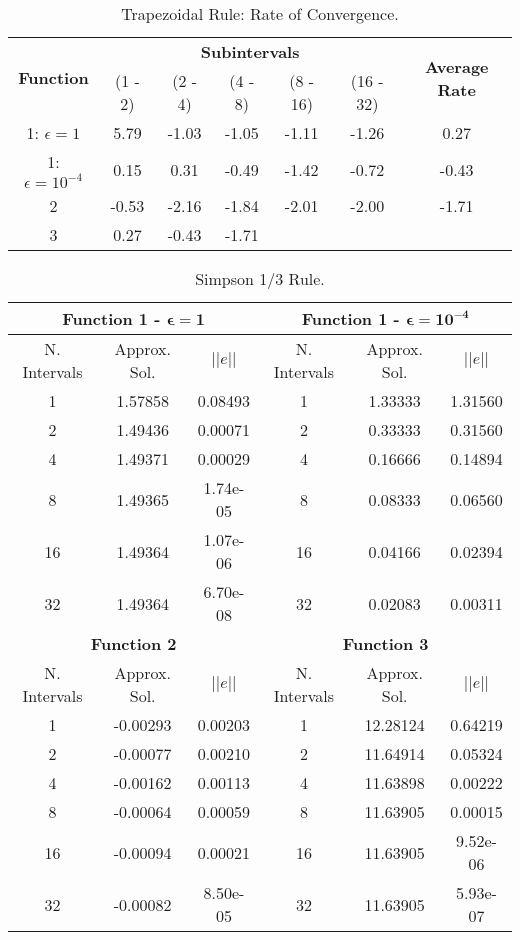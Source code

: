 \begin{table}[H]
    \centering
    \caption{Trapezoidal Rule: Rate of Convergence.}
    \begin{tabular}{ccccccc}
        \hline
        \multirow{2}{*}{\textbf{Function}} & \multicolumn{5}{c}{\textbf{Subintervals}} & \multicolumn{1}{c}{\multirow{2}{*}{\textbf{Average Rate}}} \\ \cline{2-6}
 & (1 - 2) & (2 - 4) & (4 - 8) & (8 - 16) & (16 - 32) & \multicolumn{1}{c}{} \\ \hline
        1: $\epsilon = 1$ & 5.79 & -1.03 & -1.05 & -1.11 & -1.26 & 0.27 \\
        1: $\epsilon = 10^{-4}$ & 0.15 & 0.31 & -0.49 & -1.42 & -0.72 & -0.43 \\
        2 & -0.53 & -2.16 & -1.84 & -2.01 & -2.00 & -1.71 \\ 
        3 & 0.27 & -0.43 & -1.71 \\ \hline
    \end{tabular}
\end{table}
\begin{table}[H]
    \centering
    \caption{Simpson 1/3 Rule.}
    \begin{tabular}{ccc|ccc}
    \hline
    \multicolumn{3}{c}{\textbf{Function 1  -} $\bm{\epsilon = 1}$} & \multicolumn{3}{c}{\textbf{Function 1 -} $\bm{\epsilon = 10^{-4}}$} \\ \hline
    N. Intervals & Approx. Sol. & $|| e ||$ & N. Intervals & Approx. Sol. & $|| e ||$ \\ \hline
    1 & 1.57858 & 0.08493 & 1 & 1.33333& 1.31560 \\
    2 & 1.49436 & 0.00071 & 2 & 0.33333 & 0.31560 \\
    4 & 1.49371 & 0.00029 & 4 & 0.16666 & 0.14894 \\
    8 & 1.49365 & 1.74e-05 & 8 & 0.08333 & 0.06560 \\
    16 & 1.49364 & 1.07e-06 & 16 & 0.04166 & 0.02394 \\
    32 & 1.49364 & 6.70e-08 & 32 & 0.02083 & 0.00311 \\ \hline
    \multicolumn{3}{c}{\textbf{Function 2}} & \multicolumn{3}{c}{\bf{Function 3}} \\ \hline
    N. Intervals & Approx. Sol. & $|| e ||$ & N. Intervals & Approx. Sol. & $|| e ||$ \\ \hline
    1 & -0.00293  & 0.00203  & 1 & 12.28124 &  0.64219 \\
    2 & -0.00077  & 0.00210  & 2 & 11.64914 &  0.05324 \\
    4 & -0.00162  & 0.00113  & 4 & 11.63898  & 0.00222 \\
    8 & -0.00064 & 0.00059  & 8 &  11.63905 &  0.00015 \\
    16 & -0.00094 & 0.00021 & 16 & 11.63905 &  9.52e-06 \\
    32 & -0.00082 & 8.50e-05  & 32 & 11.63905  & 5.93e-07  \\ \hline
    \end{tabular}
\end{table}
